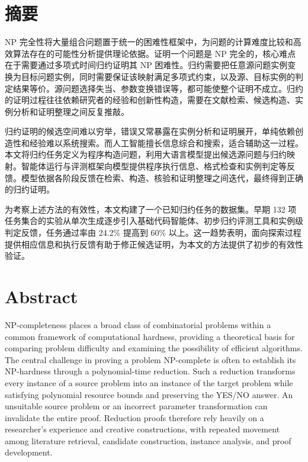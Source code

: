 \maketitle
\MAKETITLE

\intobmk\chapter*{摘\quad 要}
\setcounter{page}{1}

NP 完全性将大量组合问题置于统一的困难性框架中，为问题的计算难度比较和高效算法存在的可能性分析提供理论依据。证明一个问题是 NP 完全的，核心难点在于需要通过多项式时间归约证明其 NP 困难性。归约需要把任意源问题实例变换为目标问题实例，同时需要保证该映射满足多项式约束，以及源、目标实例的判定结果等价。源问题选择失当、参数变换错误等，都可能使整个证明不成立。归约的证明过程往往依赖研究者的经验和创新性构造，需要在文献检索、候选构造、实例分析和证明整理之间反复推敲。

归约证明的候选空间难以穷举，错误又常暴露在实例分析和证明展开，单纯依赖创造性和经验难以系统搜索。而人工智能擅长信息综合和搜索，适合辅助这一过程。本文将归约任务定义为程序构造问题，利用大语言模型提出候选源问题与归约映射。智能体运行与评测框架向模型提供程序执行信息、格式检查和实例判定等反馈。模型依据各阶段反馈在检索、构造、核验和证明整理之间迭代，最终得到正确的归约证明。

为考察上述方法的有效性，本文构建了一个已知归约任务的数据集。早期 132 项任务集合的实验从单次生成逐步引入基础代码智能体、初步归约评测工具和实例级判定反馈，任务通过率由 24.2\% 提高到 60\% 以上。这一趋势表明，面向探索过程提供相应信息和执行反馈有助于修正候选证明，为本文的方法提供了初步的有效性验证。


\intobmk\chapter*{Abstract}

NP-completeness places a broad class of combinatorial problems within a common framework of computational hardness, providing a theoretical basis for comparing problem difficulty and examining the possibility of efficient algorithms. The central challenge in proving a problem NP-complete is often to establish its NP-hardness through a polynomial-time reduction. Such a reduction transforms every instance of a source problem into an instance of the target problem while satisfying polynomial resource bounds and preserving the YES/NO answer. An unsuitable source problem or an incorrect parameter transformation can invalidate the entire proof. Reduction proofs therefore rely heavily on a researcher's experience and creative constructions, with repeated movement among literature retrieval, candidate construction, instance analysis, and proof development.

